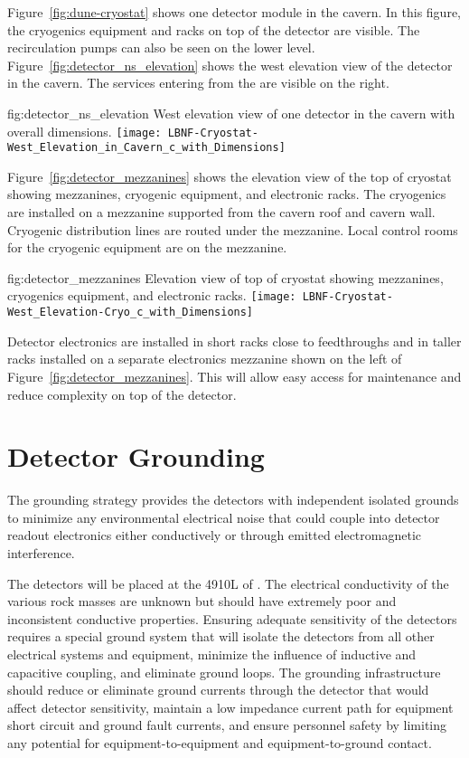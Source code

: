 Figure~\ref{fig:dune-cryostat} shows one detector module in the
cavern. In this figure, the cryogenics equipment and racks on top of
the detector are visible. The  recirculation pumps can also be seen
on the lower level.
Figure~\ref{fig:detector_ns_elevation} shows the west
elevation view of the detector in the cavern. The services entering
from the  are visible on the right.
\begin{dunefigure}{fig:detector_ns_elevation}
  {West elevation view of one detector in the cavern with overall dimensions.}
  \texttt{[image: LBNF-Cryostat-West\_Elevation\_in\_Cavern\_c\_with\_Dimensions]}
\end{dunefigure}
Figure~\ref{fig:detector_mezzanines} shows the elevation view of the
top of cryostat showing mezzanines, cryogenic equipment, and
electronic racks.
The cryogenics are installed on a mezzanine supported from
the cavern roof and cavern wall. Cryogenic distribution lines are
routed under the mezzanine. Local control rooms for the
cryogenic equipment are on the mezzanine.
\begin{dunefigure}{fig:detector_mezzanines}
  {Elevation view of top of cryostat showing mezzanines, cryogenics
    equipment, and electronic racks.}
  \texttt{[image: LBNF-Cryostat-West\_Elevation-Cryo\_c\_with\_Dimensions]}
\end{dunefigure}

Detector electronics are installed in short racks close to
feedthroughs and in taller racks installed on a separate electronics
mezzanine shown on the left of Figure~\ref{fig:detector_mezzanines}.
This will allow easy access for maintenance and reduce complexity on
top of the detector.

\section{Detector Grounding}
\label{sec:fdsp-coord-faci-grounding}


The grounding strategy provides the detectors with independent
isolated grounds to minimize any environmental electrical noise that
could couple into detector readout electronics either conductively or
through emitted electromagnetic interference.

The detectors will be placed at the 4910L of \surf. The
electrical conductivity of the various rock masses are unknown but
should have extremely poor and inconsistent conductive
properties. Ensuring adequate sensitivity of the detectors requires a
special ground system that will isolate the detectors from all other
electrical systems and equipment, minimize the influence of inductive
and capacitive coupling, and eliminate ground loops. The grounding
infrastructure should reduce or eliminate ground currents through the
detector that would affect detector sensitivity, maintain a low
impedance current path for equipment short circuit and ground fault
currents, and ensure personnel safety by limiting any potential for
equipment-to-equipment and equipment-to-ground contact.

